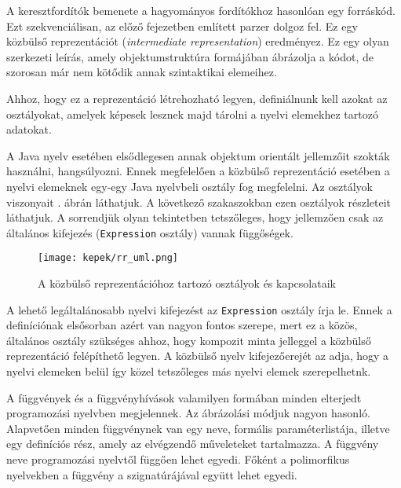 
A keresztfordítók bemenete a hagyományos fordítókhoz hasonlóan egy forráskód. Ezt szekvenciálisan, az előző fejezetben említett parzer dolgoz fel. Ez egy közbülső reprezentációt (\textit{intermediate representation}) eredményez. Ez egy olyan szerkezeti leírás, amely objektumstruktúra formájában ábrázolja a kódot, de szorosan már nem kötődik annak szintaktikai elemeihez.

Ahhoz, hogy ez a reprezentáció létrehozható legyen, definiálnunk kell azokat az osztályokat, amelyek képesek lesznek majd tárolni a nyelvi elemekhez tartozó adatokat.


A Java nyelv esetében elsődlegesen annak objektum orientált jellemzőit szokták használni, hangsúlyozni. Ennek megfelelően a közbülső reprezentáció esetében a nyelvi elemeknek egy-egy Java nyelvbeli osztály fog megfelelni. Az osztályok viszonyait . ábrán láthatjuk. A következő szakaszokban ezen osztályok részleteit láthatjuk. A sorrendjük olyan tekintetben tetszőleges, hogy jellemzően csak az általános kifejezés (\texttt{Expression} osztály) vannak függőségek.

\begin{figure}
\centering
\texttt{[image: kepek/rr\_uml.png]}
\caption{A közbülső reprezentációhoz tartozó osztályok és kapcsolataik}
\label{fig:internal}
\end{figure}


A lehető legáltalánosabb nyelvi kifejezést az \texttt{Expression} osztály írja le. Ennek a definíciónak elsősorban azért van nagyon fontos szerepe, mert ez a közös, általános osztály szükséges ahhoz, hogy kompozit minta jelleggel a közbülső reprezentáció felépíthető legyen. A közbülső nyelv kifejezőerejét az adja, hogy a nyelvi elemeken belül így közel tetszőleges más nyelvi elemek szerepelhetnk.


A függvények és a függvényhívások valamilyen formában minden elterjedt programozási nyelvben megjelennek. Az ábrázolási módjuk nagyon hasonló. Alapvetően minden függvénynek van egy neve, formális paraméterlistája, illetve egy definíciós rész, amely az elvégzendő műveleteket tartalmazza. A függvény neve programozási nyelvtől függően lehet egyedi. Főként a polimorfikus nyelvekben a függvény a szignatúrájával együtt lehet egyedi.

